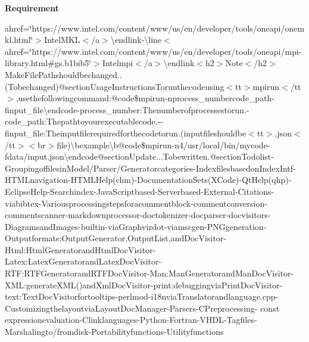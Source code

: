 {\bfseries Requirement} {\bfseries } 
\begin{DoxyItemize}
\item ahref=\char`\"{}https\-://www.\-intel.\-com/content/www/us/en/developer/tools/oneapi/onemkl.\-html\char`\"{}$>$\-IntelM\-K\-L$<$/a$>$\textbackslash{}endlink-\/\textbackslash{}line$<$ahref=\char`\"{}https\-://www.\-intel.\-com/content/www/us/en/developer/tools/oneapi/mpi-\/library.\-html\#gs.\-b1bib5\char`\"{}$>$\-Intelmpi$<$/a$>$\textbackslash{}endlink$<$h2$>$\-Note$<$/h2$>$Make\-FilePathshouldbechanged..(\-Tobechanged)@sectionUsageInstructionsTorunthecodeusing$<$tt$>$mpirun$<$/tt$>$,usethefollowingcommand\-:@code\$mpirun-\/nprocess\-\_\-numbercode\-\_\-path-\/finput\-\_\-file\textbackslash{}endcode-\/process\-\_\-number\-:Thenumberofprocessestorun.-\/code\-\_\-path\-:Thepathtoyourexecutablecode.-\/-\/finput\-\_\-file\-:Theinputfilerequiredforthecodetorun.(inputfileshouldbe$<$tt$>$.\-json$<$/tt$>$$<$br$>$file)\textbackslash{}bexample\textbackslash{}b@code\$mpirun-\/n4/usr/local/bin/mycode-\/fdata/input.\-json\textbackslash{}endcode@sectionUpdate...Tobewritten.@sectionTodolist-\/GroupingoffilesinModel/Parser/Generatorcategories-\/IndexfilesbasedonIndex\-Intf-\/H\-T\-M\-Lnavigation-\/H\-T\-M\-LHelp(chm)-\/DocumentationSets(\-X\-Code)-\/QtHelp(qhp)-\/EclipseHelp-\/Searchindex-\/Java\-Scriptbased-\/Serverbased-\/External-\/Citations-\/viabibtex-\/Variousprocessingstepsforacommentblock-\/commentconversion-\/commentscanner-\/markdownprocessor-\/doctokenizer-\/docparser-\/docvisitors-\/DiagramsandImages-\/builtin-\/viaGraphvizdot-\/viamscgen-\/P\-N\-Ggeneration-\/Outputformats\-:Output\-Generator,Output\-List,andDoc\-Visitor-\/Html\-:Html\-GeneratorandHtml\-Doc\-Visitor-\/Latex\-:Latex\-GeneratorandLatex\-Doc\-Visitor-\/R\-T\-F\-:R\-T\-F\-GeneratorandR\-T\-F\-Doc\-Visitor-\/Man\-:Man\-GeneratorandMan\-Doc\-Visitor-\/X\-M\-L\-:generate\-X\-M\-L()andXml\-Doc\-Visitor-\/print\-:debuggingviaPrint\-Doc\-Visitor-\/text\-:Text\-Doc\-Visitorfortooltips-\/perlmod-\/i18nviaTranslatorandlanguage.\-cpp-\/CustomizingthelayoutviaLayout\-Doc\-Manager-\/Parsers-\/CPreprocessing-\/ const expressionevaluation-\/Clinklanguages-\/Python-\/Fortran-\/V\-H\-D\-L-\/Tagfiles-\/Marshalingto/fromdisk-\/Portabilityfunctions-\/Utilityfunctions
\end{DoxyItemize}